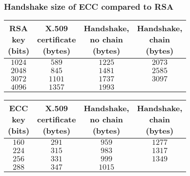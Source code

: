 \documentclass{beamer}
\begin{document}
\begin{frame}
	\frametitle{Handshake size of ECC compared to RSA}
	\begin{center}
		\begin{tabular}{|c|c|c|c|}
			\hline
			\thead{RSA \\key \\(bits)}& \thead{X.509 \\certificate \\(bytes)} & \thead{Handshake,\\ no chain \\(bytes)}& \thead{Handshake, \\chain \\(bytes)} \\ \hline
			$1024$ & $ 589 $ & $ 1225 $ & $ 2073 $ \\ \hline  
			$2048$ & $ 845 $ & $ 1481 $ & $ 2585 $ \\ \hline  
			$3072$ & $ 1101 $ & $ 1737 $ & $ 3097 $ \\ \hline  
			$4096$ & $ 1357 $ & $ 1993 $ &  \\ \hline
		\end{tabular} 
		\begin{tabular}{|c|c|c|c|}
			\hline
			\thead{ECC \\key \\(bits)}& \thead{X.509 \\certificate \\(bytes)} & \thead{Handshake,\\ no chain \\(bytes)}& \thead{Handshake, \\chain \\(bytes)} \\ \hline
			$160$ & $ 291 $ & $ 959 $ & $ 1277 $ \\ \hline  
			$224$ & $ 315 $ & $ 983 $ & $ 1317 $ \\ \hline  
			$256$ & $ 331 $ & $ 999 $ & $ 1349 $ \\ \hline  
			$288$ & $ 347 $ & $ 1015 $ &  \\ \hline
		\end{tabular} 
	\end{center}
\end{frame}
\end{document}
